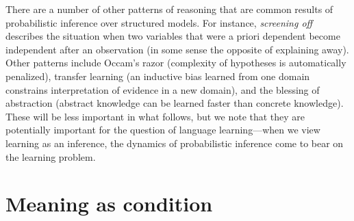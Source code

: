 \documentclass[12pt]{article}
\begin{document}

There are a number of other patterns of reasoning that are common results of probabilistic inference over structured models. For instance, \emph{screening off} describes the situation when two variables that were a priori dependent become independent after an observation (in some sense the opposite of explaining away).
Other patterns include Occam's razor (complexity of hypotheses is automatically penalized), transfer learning (an inductive bias learned from one domain constrains interpretation of evidence in a new domain), and the blessing of abstraction (abstract knowledge can be learned faster than concrete knowledge). These will be less important in what follows, but we note that they are potentially important for the question of language learning---when we view learning as an inference, the dynamics of probabilistic inference come to bear on the learning problem.


 
 
 
\section{Meaning as condition}
 
\end{document}
